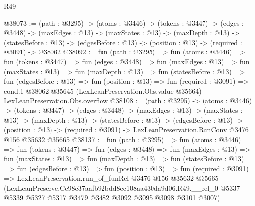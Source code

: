 \begin{lexlean}{R49}
\begin{coremodule}
@38073 := (path : @3295) ->
  (atoms : @3446) ->
  (tokens : @3447) ->
  (edges : @3448) ->
  (maxEdges : @13) ->
  (maxStates : @13) ->
  (maxDepth : @13) ->
  (statesBefore : @13) -> (edgesBefore : @13) -> (position : @13) -> (required : @3091) -> @38062
@38092 := fun (path : @3295) =>
  fun (atoms : @3446) =>
  fun (tokens : @3447) =>
  fun (edges : @3448) =>
  fun (maxEdges : @13) =>
  fun (maxStates : @13) =>
  fun (maxDepth : @13) =>
  fun (statesBefore : @13) =>
  fun (edgesBefore : @13) =>
  fun (position : @13) =>
  fun (required : @3091) =>
  cond.{1} @38062 @35645 (LexLeanPreservation.Obs.value @35664) LexLeanPreservation.Obs.overflow
@38108 := (path : @3295) ->
  (atoms : @3446) ->
  (tokens : @3447) ->
  (edges : @3448) ->
  (maxEdges : @13) ->
  (maxStates : @13) ->
  (maxDepth : @13) ->
  (statesBefore : @13) ->
  (edgesBefore : @13) ->
  (position : @13) -> (required : @3091) -> LexLeanPreservation.RunConv @3476 @156 @35632 @35665
@38137 := fun (path : @3295) =>
  fun (atoms : @3446) =>
  fun (tokens : @3447) =>
  fun (edges : @3448) =>
  fun (maxEdges : @13) =>
  fun (maxStates : @13) =>
  fun (maxDepth : @13) =>
  fun (statesBefore : @13) =>
  fun (edgesBefore : @13) =>
  fun (position : @13) =>
  fun (required : @3091) =>
  LexLeanPreservation.run_of_funRel
    @3476
    @156
    @35632
    @35665
    (LexLeanPreserve.Cc98c37aafb92bdd8ec108aa430da9d06.R49.__rel_0
      @5337
      @5339
      @5327
      @5317
      @3479
      @3482
      @3092
      @3095
      @3098
      @3101
      @3007)
\end{coremodule}
\end{lexlean}
